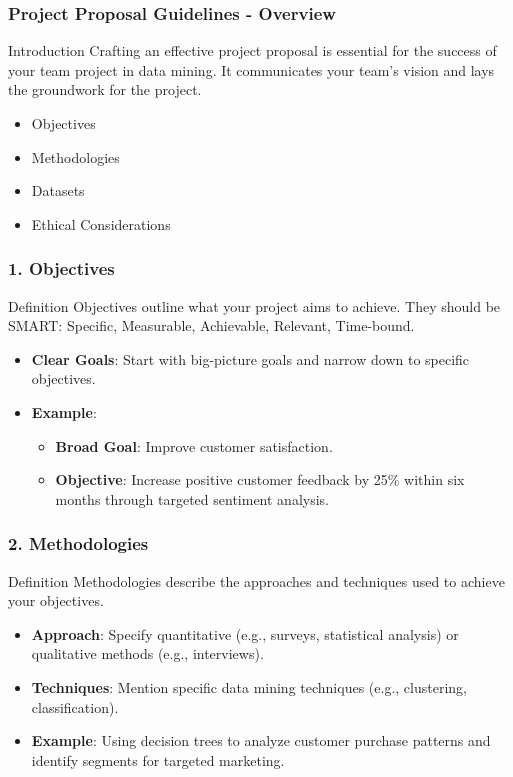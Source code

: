 \documentclass[aspectratio=169]{beamer}
\begin{document}
\begin{frame}[fragile]
    \frametitle{Project Proposal Guidelines - Overview}
    \begin{block}{Introduction}
        Crafting an effective project proposal is essential for the success of your team project in data mining. It communicates your team's vision and lays the groundwork for the project.
    \end{block}
    \begin{itemize}
        \item Objectives
        \item Methodologies
        \item Datasets
        \item Ethical Considerations
    \end{itemize}
\end{frame}

\begin{frame}[fragile]
    \frametitle{1. Objectives}
    \begin{block}{Definition}
        Objectives outline what your project aims to achieve. They should be SMART: Specific, Measurable, Achievable, Relevant, Time-bound.
    \end{block}
    \begin{itemize}
        \item \textbf{Clear Goals}: Start with big-picture goals and narrow down to specific objectives.
        \item \textbf{Example}:
            \begin{itemize}
                \item \textbf{Broad Goal}: Improve customer satisfaction.
                \item \textbf{Objective}: Increase positive customer feedback by 25\% within six months through targeted sentiment analysis.
            \end{itemize}
    \end{itemize}
\end{frame}

\begin{frame}[fragile]
    \frametitle{2. Methodologies}
    \begin{block}{Definition}
        Methodologies describe the approaches and techniques used to achieve your objectives.
    \end{block}
    \begin{itemize}
        \item \textbf{Approach}: Specify quantitative (e.g., surveys, statistical analysis) or qualitative methods (e.g., interviews).
        \item \textbf{Techniques}: Mention specific data mining techniques (e.g., clustering, classification).
        \item \textbf{Example}: Using decision trees to analyze customer purchase patterns and identify segments for targeted marketing.
    \end{itemize}
\end{frame}
\end{document}

